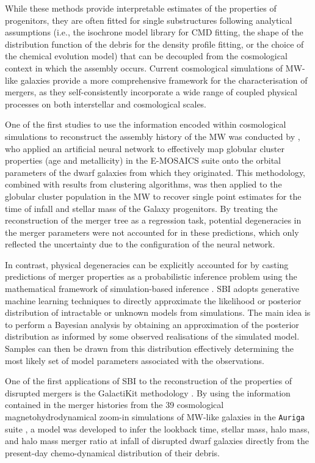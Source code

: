 While these methods provide interpretable estimates of the properties of progenitors, they are often fitted for single substructures following analytical assumptions (i.e., the isochrone model library for CMD fitting, the shape of the distribution function of the debris for the density profile fitting, or the choice of the chemical evolution model) that can be decoupled from the cosmological context in which the assembly occurs. Current cosmological simulations of MW-like galaxies provide a more comprehensive framework for the characterisation of mergers, as they self-consistently incorporate a wide range of coupled physical processes on both interstellar and cosmological scales. 


One of the first studies to use the information encoded within cosmological simulations to reconstruct the assembly history of the MW was conducted by \cite{Kruijssen2020}, who applied an artificial neural network to effectively map globular cluster properties (age and metallicity) in the E-MOSAICS suite \citep{Kruijssen2019a} onto the orbital parameters of the dwarf galaxies from which they originated. This methodology, combined with results from clustering algorithms, was then applied to the globular cluster population in the MW to recover single point estimates for the time of infall and stellar mass of the Galaxy progenitors. By treating the reconstruction of the merger tree as a regression task, potential degeneracies in the merger parameters were not accounted for in these predictions, which only reflected the uncertainty due to the configuration of the neural network.  


In contrast, physical degeneracies can be explicitly accounted for by casting predictions of merger properties as a probabilistic inference problem using the mathematical framework of simulation-based inference \citep[SBI,][]{Cranmer2020,Ho2024}. SBI adopts generative machine learning techniques to directly approximate the likelihood or posterior distribution of intractable or unknown models from simulations. The main idea is to perform a Bayesian analysis by obtaining an approximation of the posterior distribution as informed by some observed realisations of the simulated model. Samples can then be drawn from this distribution effectively determining the most likely set of model parameters associated with the observations. \

One of the first applications of SBI to the reconstruction of the properties of disrupted mergers is the GalactiKit methodology \citep{Sante2025a}. By using the information contained in the merger histories from the 39 cosmological magnetohydrodynamical zoom-in simulations of MW-like galaxies in the \texttt{Auriga} suite \citep{Grand2017,Grand2024a}, a model was developed to infer the lookback time, stellar mass, halo mass, and halo mass merger ratio at infall of disrupted dwarf galaxies directly from the present-day chemo-dynamical distribution of their debris.  

